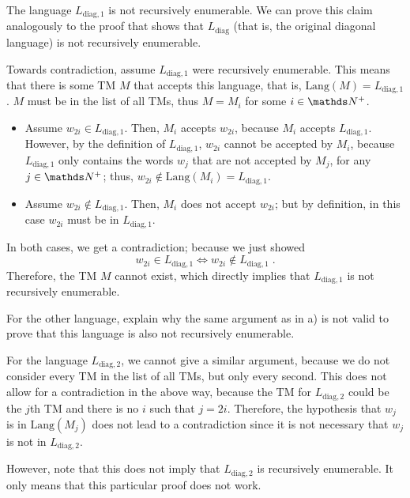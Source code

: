 \documentclass{exercise}
\begin{document}
  \begin{solution}
    The language $L_{\text{diag},1}$ is not recursively enumerable.  We can prove
    this claim analogously to the proof that shows that $L_{\text{diag}}$ (that is,
    the original diagonal language) is not recursively enumerable.
    
    Towards contradiction, assume $L_{\text{diag},1}$ were recursively
    enumerable.  This means that there is some TM $M$ that accepts this
    language, that is, $\text{Lang}(M)=L_{\text{diag},1}$.  $M$ must be in the list of
    all TMs, thus $M=M_i$ for some $i\in\nat^+$.
    \begin{itemize}
      \item Assume $w_{2i}\in L_{\text{diag},1}$.  Then, $M_i$ accepts $w_{2i}$, because
        $M_i$ accepts $L_{\text{diag},1}$.  However, by the definition of
        $L_{\text{diag},1}$, $w_{2i}$ cannot be accepted by $M_i$, because
        $L_{\text{diag},1}$ only contains the words $w_j$ that are not accepted
        by $M_j$, for any $j\in\nat^+$; thus, $w_{2i}\notin\text{Lang}(M_i)=L_{\text{diag},1}$.
      \item Assume $w_{2i}\notin L_{\text{diag},1}$.  Then, $M_i$ does not
        accept $w_{2i}$; but by definition, in this case $w_{2i}$ must be in
        $L_{\text{diag},1}$.
    \end{itemize}
    In both cases, we get a contradiction; because we just showed
    \[ w_{2i}\in L_{\text{diag},1} \iff w_{2i}\notin L_{\text{diag},1}\;. \]
    Therefore, the TM $M$ cannot exist,
    which directly implies that $L_{\text{diag},1}$ is not recursively enumerable.
  \end{solution}

\subtask For the other language, explain why the same argument as in a) is not
  valid to prove that this language is also not recursively enumerable.

  \begin{solution}
    For the language $L_{\text{diag},2}$, we cannot give a similar argument,
    because we do not consider every TM in the list of all TMs, but only every
    second.  This does not allow for a contradiction in the above way, because
    the TM for $L_{\text{diag},2}$ could be the $j$th TM and there is no $i$ such
    that $j=2i$.  Therefore, the hypothesis that $w_j$ is in $\text{Lang}(M_j)$
    does not lead to a contradiction since it is not necessary that $w_j$
    is not in $L_{\text{diag},2}$.

    However, note that this does not imply that $L_{\text{diag},2}$ is
    recursively enumerable.  It only means that this particular proof does not
    work.
  \end{solution}
\end{document}
